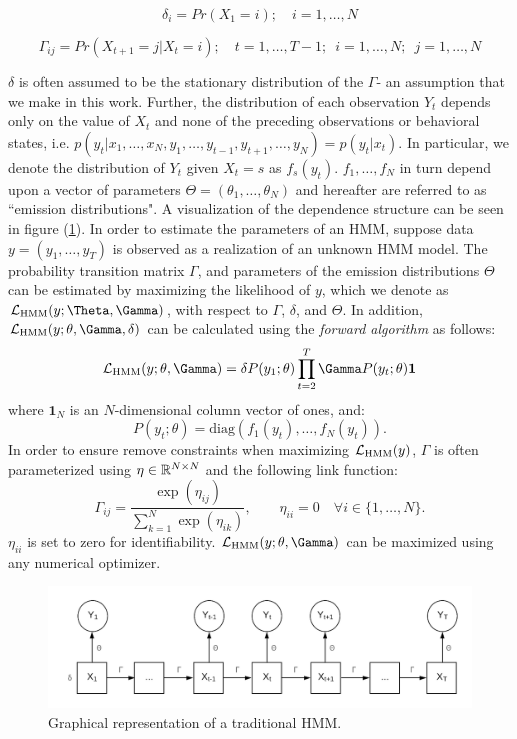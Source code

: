 $$\delta_i = Pr(X_1 = i); \quad i = 1,\ldots,N$$

$$\Gamma_{ij} = Pr(X_{t+1} = j | X_t = i); \quad t = 1, \ldots, T-1; \enspace i = 1,\ldots,N; \enspace j=1,\ldots,N $$

$\delta$ is often assumed to be the stationary distribution of the $\Gamma$- an assumption that we make in this work. Further, the distribution of each observation $Y_t$ depends only on the value of $X_t$ and none of the preceding observations or behavioral states, i.e. $p(y_t|x_1,\ldots, x_N, y_1,\ldots,y_{t-1},y_{t+1},\ldots,y_N) = p(y_t|x_t)$. In particular, we denote the distribution of $Y_t$ given $X_t = s$ as $f_s(y_t)$. $f_1,\ldots,f_N$ in turn depend upon a vector of parameters $\Theta = (\theta_1,\ldots,\theta_N)$ and hereafter are referred to as ``emission distributions". A visualization of the dependence structure can be seen in figure (\ref{fig:HMM}).
In order to estimate the parameters of an HMM, suppose data $y = (y_1,\ldots,y_T)$ is observed as a realization of an unknown HMM model. The probability transition matrix $\Gamma$, and parameters of the emission distributions $\Theta$ can be estimated by maximizing the likelihood of $y$, which we denote as $\calL_{\text{HMM}}(y;\Theta,\Gamma)$, with respect to $\Gamma$, $\delta$, and $\Theta$. In addition, $\calL_{\text{HMM}}(y;\theta,\Gamma,\delta)$ can be calculated using the \textit{forward algorithm} \cite{Zucchini:2016} as follows:
%
$$\calL_{\text{HMM}}(y;\theta,\Gamma) = \delta P(y_1;\theta) \prod_{t=2}^T \Gamma P(y_t;\theta) \mathbf{1}$$
%
where $\mathbf{1}_N$ is an $N$-dimensional column vector of ones, and:
%
$$P(y_t;\theta) = \text{diag}(f_1(y_t),\ldots , f_N(y_t)).$$
%
In order to ensure remove constraints when maximizing $\mathcal{L}_{\text{HMM}}(y)$, $\Gamma$ is often parameterized using $\eta \in \mathbb{R}^{N \times N}$ and the following link function:
%
$$\Gamma_{ij} = \frac{\exp(\eta_{ij})}{\sum_{k=1}^N \exp(\eta_{ik})}, \qquad \eta_{ii} = 0 \quad \forall i \in \{1, \ldots, N\}.$$
%
$\eta_{ii}$ is set to zero for identifiability. $\calL_{\text{HMM}}(y;\theta,\Gamma)$ can be maximized using any numerical optimizer.

\begin{figure}[h!]
	\centering
	\includegraphics[width=5in]{../Plots/HMM.png}
	\caption{Graphical representation of a traditional HMM.}
	\label{fig:HMM}
\end{figure}


